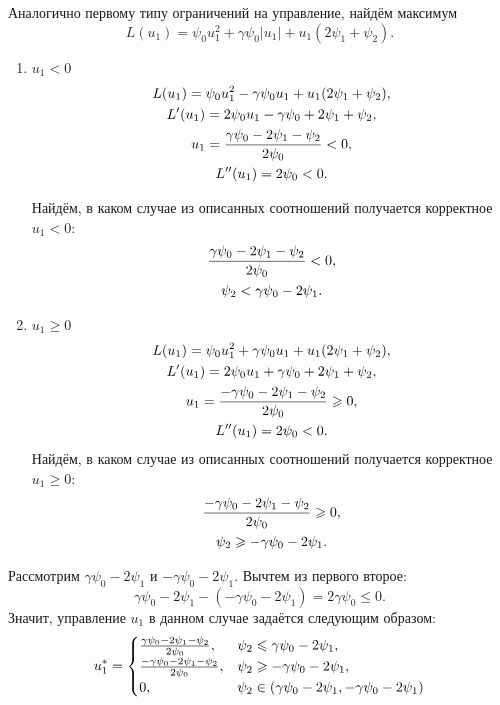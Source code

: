 \documentclass[11pt]{article}
\newcommand\abs[1]{\left\lvert#1\right\rvert}
\begin{document}
Аналогично первому типу ограничений на управление, найдём максимум
$$
L(u_1) = \psi_0 u_1^2 + \gamma \psi_0 \abs{u_1} + u_1(2\psi_1 + \psi_2).
$$
\begin{enumerate}
\item $u_1 < 0$
\begin{gather}
L(u_1) = \psi_0 u_1^2 - \gamma \psi_0 u_1 + u_1(2\psi_1 + \psi_2), \notag \\
L'(u_1) = 2 \psi_0 u_1 - \gamma \psi_0 + 2\psi_1 + \psi_2, \notag \\
u_1 = \frac{\gamma \psi_0 - 2\psi_1 - \psi_2}{2\psi_0} < 0, \notag \\
L''(u_1) = 2\psi_0 < 0. \notag
\end{gather}

Найдём, в каком случае из описанных соотношений получается корректное $u_1 < 0$:
\begin{gather}
\frac{\gamma \psi_0 - 2\psi_1 - \psi_2}{2\psi_0} < 0, \notag \\
\psi_2 < \gamma \psi_0 - 2\psi_1. \notag
\end{gather}
\item $u_1 \geqslant 0$
\begin{gather}
L(u_1) = \psi_0 u_1^2 + \gamma \psi_0 u_1 + u_1(2\psi_1 + \psi_2), \notag \\
L'(u_1) = 2 \psi_0 u_1 + \gamma \psi_0 + 2\psi_1 + \psi_2, \notag \\
u_1 = \frac{-\gamma \psi_0 - 2\psi_1 - \psi_2}{2\psi_0} \geqslant 0, \notag \\
L''(u_1) = 2\psi_0 < 0. \notag
\end{gather}
Найдём, в каком случае из описанных соотношений получается корректное $u_1 \geqslant 0$:
\begin{gather}
\frac{-\gamma \psi_0 - 2\psi_1 - \psi_2}{2\psi_0} \geqslant 0, \notag \\
\psi_2 \geqslant -\gamma \psi_0 - 2\psi_1. \notag
\end{gather}
\end{enumerate}
Рассмотрим $\gamma \psi_0 - 2\psi_1$ и $-\gamma \psi_0 - 2\psi_1$. Вычтем из первого второе:
$$
\gamma \psi_0 - 2\psi_1 - \left(-\gamma \psi_0 - 2\psi_1 \right) = 2\gamma\psi_0 \leqslant 0.
$$
Значит, управление $u_1$ в данном случае задаётся следующим образом:
$$
u_1^* = 
\begin{cases}
\frac{\gamma\psi_0 - 2\psi_1 - \psi_2}{2\psi_0}, & \psi_2 \leqslant \gamma\psi_0 - 2\psi_1, \\
\frac{-\gamma\psi_0 - 2\psi_1 - \psi_2}{2\psi_0}, & \psi_2 \geqslant -\gamma\psi_0 - 2\psi_1, \\
0, & \psi_2 \in \left( \gamma\psi_0 - 2\psi_1, -\gamma\psi_0 - 2\psi_1 \right)
\end{cases} \notag
$$
\end{document}
